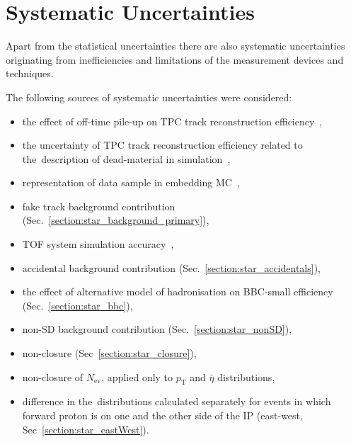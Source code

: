 \chapter{Systematic Uncertainties}\label{section:star_systematics}
Apart from the statistical uncertainties there are also systematic uncertainties originating from inefficiencies and limitations of the measurement devices and techniques. 


The following sources of systematic uncertainties were considered:
\begin{itemize}
	\item the effect of off-time pile-up on TPC track reconstruction efficiency~\cite{supplementaryNote},
	\item the uncertainty of TPC track reconstruction efficiency related to the~description of dead-material in simulation~\cite{supplementaryNote},
	\item representation of data sample in embedding MC~\cite{supplementaryNote},
	\item fake track background contribution (Sec.~\ref{section:star_background_primary}),
	\item TOF system simulation accuracy~\cite{supplementaryNote},
	\item accidental background contribution (Sec.~\ref{section:star_accidentals}),
	\item the effect of alternative model of hadronisation on BBC-small efficiency (Sec.~\ref{section:star_bbc}),
	\item non-SD background contribution (Sec.~\ref{section:star_nonSD}),
	\item non-closure (Sec~\ref{section:star_closure}),%
	\item non-closure of $N_\textrm{ev}$, applied only to $p_\textrm{T}$ and $\bar{\eta}$ distributions,
	\item difference in the~distributions calculated separately for events in which forward proton is on one and the other side of the IP (east-west, Sec~\ref{section:star_eastWest}).
\end{itemize}


